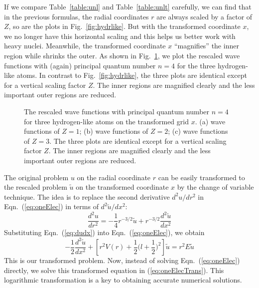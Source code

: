 If we compare Table~\ref{table:unl} and Table~\ref{table:unlt} carefully, we can
find that in the previous formulas, the radial coordinates $r$ are always scaled by a factor
of $Z$, so are the plots in Fig.~\ref{fig:hydrlike}. But with the transformed
coordinate $x$, we no longer have this horizontal scaling and this helps us better work
with heavy nuclei. Meanwhile, the transformed coordinate $x$ ``magnifies'' the
inner region while shrinks the outer. As shown in Fig.~\ref{fig:hydrliket},
we plot the rescaled wave functions with (again) principal quantum number $n=4$
for the three hydrogen-like atoms. In contrast to Fig.~\ref{fig:hydrlike},
the three plots are identical except for a vertical scaling factor $Z$.
The inner regions are magnified clearly and the less important outer regions are reduced.
\begin{figure}[h!]
\centering
\subfloat[][$Z=1$]{\texttt{[image: Z1t]}\label{fig:Z1t}}
\subfloat[][$Z=2$]{\texttt{[image: Z2t]}\label{fig:Z2t}}
\subfloat[][$Z=3$]{\texttt{[image: Z3t]}\label{fig:Z3t}}
\caption{The rescaled wave functions with principal quantum number $n=4$
for three hydrogen-like atoms on the transformed grid $x$. (a) wave functions of $Z=1$;
(b) wave functions of $Z=2$; (c) wave functions of $Z=3$. The three plots are
identical except for a vertical scaling factor $Z$. The inner regions
are magnified clearly and the less important outer regions are reduced.}
\label{fig:hydrliket}
\end{figure}

The original problem $u$ on the radial coordinate $r$ can be easily transformed to the
rescaled problem $\tilde{u}$ on the transformed coordinate $x$ by the change of variable
technique. The idea is to replace the second derivative $d^2u/dr^2$ in Eqn.~(\ref{eq:oneElec})
in terms of $d^2\tilde{u}/dx^2$:
\begin{equation} \label{eq:dudx}
\frac{d^2u}{dr^2} = -\frac{1}{4}r^{-3/2} \tilde{u} + r^{-3/2} \frac{d^2 \tilde{u}}{dx^2}
\end{equation}
%
Substituting Eqn.~(\ref{eq:dudx}) into Eqn.~(\ref{eq:oneElec}), we obtain
\begin{equation} \label{eq:oneElecTrans}
-\frac{1}{2} \frac{d^2\tilde{u}}{dx^2} + \left[ r^2 V(r) + \frac{1}{2} \Big(l+\frac{1}{2}\Big)^2 \right] \tilde{u} = r^2 E \tilde{u}
\end{equation}
This is our transformed problem. Now, instead of solving
Eqn.~(\ref{eq:oneElec}) directly, we solve this
transformed equation in (\ref{eq:oneElecTrans}). This logarithmic
transformation is a key to obtaining accurate numerical solutions.


